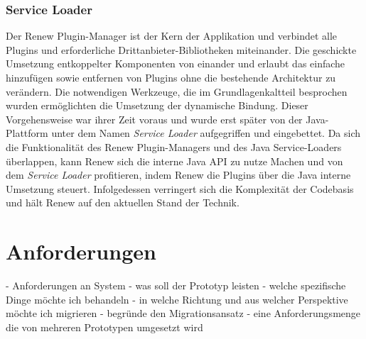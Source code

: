 \subsubsection{Service Loader} 
Der Renew Plugin-Manager ist der Kern der Applikation und verbindet alle Plugins und  erforderliche Drittanbieter-Bibliotheken miteinander. Die geschickte Umsetzung entkoppelter Komponenten von einander und erlaubt das einfache hinzufügen sowie entfernen von Plugins ohne die bestehende Architektur zu verändern. Die notwendigen Werkzeuge, die im Grundlagenkaltteil besprochen wurden ermöglichten die Umsetzung der dynamische Bindung. Dieser Vorgehensweise war ihrer Zeit voraus und wurde erst später von der Java-Plattform unter dem Namen \textit{Service Loader} aufgegriffen und eingebettet.
Da sich die Funktionalität des Renew Plugin-Managers und des Java Service-Loaders überlappen, kann Renew sich die interne Java API zu nutze Machen und von dem \textit{Service Loader} profitieren, indem Renew die Plugins über die Java interne Umsetzung steuert. Infolgedessen verringert sich die Komplexität der Codebasis und hält Renew auf den aktuellen Stand der Technik.



\section{Anforderungen} \label{sec:anforderungen}
- Anforderungen an System 
	- was soll der Prototyp leisten 
	- welche spezifische Dinge möchte ich behandeln 
	- in welche Richtung und aus welcher Perspektive möchte ich migrieren 
	- begründe den Migrationsansatz 
	- eine Anforderungsmenge die von mehreren Prototypen umgesetzt wird 



